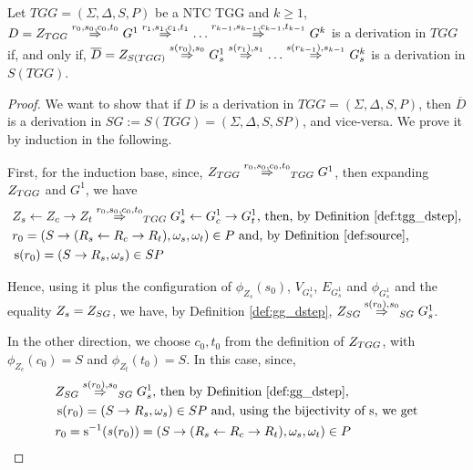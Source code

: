 \documentclass[]{report}
\begin{document}
\begin{theorem}
	\label{thm:one_d_enough}
	Let $TGG = (\Sigma, \Delta, S, P)$ be a NTC TGG and $k \ge 1$, \\
	$D = \startTG{TGG} \tderiv{r_0}{s_0,c_0,t_0}{} G^1 \tderiv{r_1}{s_1,c_1,t_1}{} \dots \tderiv{r_{k-1}}{s_{k-1},c_{k-1},t_{k-1}}{} G^k$ is a derivation in $TGG$ if, and only if, $\overline{D} = \startG{S(TGG)} \deriv{s(r_0)}{s_0}{} G^1_s \deriv{s(r_1)}{s_1}{} \dots \deriv{s(r_{k-1})}{s_{k-1}}{} G^k_s$ is a derivation in $S(TGG)$.
\end{theorem}
\begin{proof}
	We want to show that if $D$ is a derivation in $TGG = (\Sigma, \Delta, S, P)$, then $\overline{D}$ is a derivation in $SG := S(TGG) = (\Sigma, \Delta, S, SP)$, and vice-versa. We prove it by induction in the following.
	
	First, for the induction base, since, $\startTG{TGG} \tderiv{r_0}{s_0,c_0,t_0}{TGG} G^1$, then expanding $Z_{TGG}$ and $G^1$, we have
	\begin{align*}
		& Z_s \ms{} Z_c \mt{} Z_t \tderiv{r_0}{s_0,c_0,t_0}{TGG} G^1_s \ms{} G^1_c \mt{} G^1_t \text{, then, by Definition \ref{def:tgg_dstep},}\\
		& r_0 = (S \pro (R_s \ms{} R_c \mt{} R_t), \omega_s, \omega_t) \in P \text{ and, by Definition \ref{def:source},}\\
		& \source(r_0) = (S \pro R_s, \omega_s) \in SP
	\end{align*}
	
	Hence, using it plus the configuration of $\phi_{Z_s}(s_0)$, $V_{G^1_s}$, $E_{G^1_s}$ and $\phi_{G^1_s}$ and the equality $Z_s = Z_{SG}$, we have, by Definition \ref{def:gg_dstep}, $\startG{SG} \deriv{\source(r_0)}{s_0}{SG} G^1_s$.
	
	In the other direction, we choose $c_0, t_0$ from the definition of $Z_{TGG}$, with $\phi_{Z_c}(c_0) = S$ and  $\phi_{Z_t}(t_0) = S$. In this case, since,
	\begin{align*}
		& \startG{SG} \deriv{s(r_0)}{s_0}{SG} G^1_s \text{, then by Definition \ref{def:gg_dstep},}\\
		& \source(r_0) = (S \pro R_s, \omega_s) \in SP \text{ and, using the bijectivity of $\source$, we get}\\
		& r_0 = \source^{-1}(s(r_0)) = (S \pro (R_s \ms{} R_c \mt{} R_t), \omega_s, \omega_t) \in P
	\end{align*}
	

\end{proof}
\end{document}
